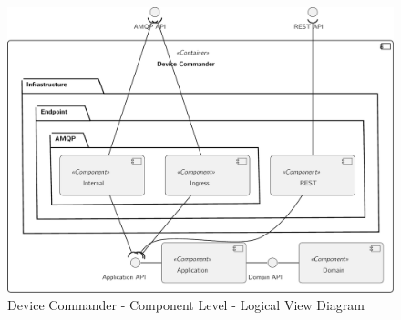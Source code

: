 \begin{figure}[H]
   \centering
   \includegraphics[page=1,width=0.7\columnwidth]{assets/diagrams/design/architectural/level3/logical/device-commander.pdf}
   \caption[Device Commander - Component Level - Logical View Diagram]{Device Commander - Component Level - Logical View Diagram}
   \label{fig:AppendixC:commander}
\end{figure}
